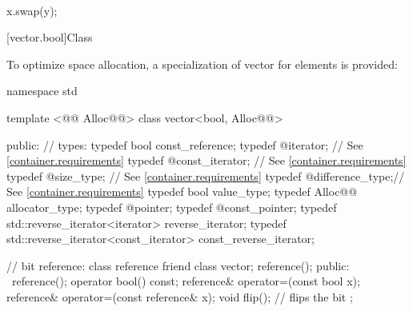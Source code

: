 \documentclass[american,twoside]{book}
\begin{document}
\begin{itemdescr}
\pnum
\effects\ 
\begin{codeblock}
x.swap(y);
\end{codeblock}
\end{itemdescr}

[vector.bool]{Class }

\pnum
{}%
To optimize space allocation, a specialization of vector for
elements is provided:

\begin{codeblock}
namespace std {
  template <@@ Alloc@@> class vector<bool, Alloc@@> {
  public:
    // types:
    typedef bool                                  const_reference;
    typedef @\impdef@                iterator;       // See \ref{container.requirements}
    typedef @\impdef@                const_iterator; // See \ref{container.requirements}
    typedef @\impdef@                size_type;      // See \ref{container.requirements}
    typedef @\impdef@                difference_type;// See \ref{container.requirements}
    typedef bool                                  value_type;
    typedef Alloc@@                             allocator_type;
    typedef @\impdef@                pointer;
    typedef @\impdef@                const_pointer;
    typedef std::reverse_iterator<iterator>       reverse_iterator;
    typedef std::reverse_iterator<const_iterator> const_reverse_iterator;

    // bit reference:
    class reference {
      friend class vector;
      reference();
    public:
      ~reference();
      operator bool() const;
      reference& operator=(const bool x);
      reference& operator=(const reference& x);
      void flip();              // flips the bit
    };

}}
\end{codeblock}
\end{document}
